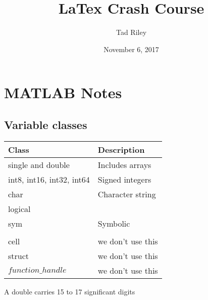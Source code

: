 \documentclass[12pt]{article}
\title{LaTex Crash Course}
\author{Tad Riley}
\date{November 6, 2017}
\begin{document}
\newpage

\section{MATLAB Notes}
\subsection{Variable classes}
\begin{tabular}{|l|l|}
	\hline
	Class & Description\\ \hline
	single and double&Includes arrays\\
	int8, int16, int32, int64&Signed integers\\
	char&Character string\\
	logical&\\
	sym&Symbolic\\
	&\\
	cell&we don't use this\\
	struct&we don't use this\\
	$function\_ handle$&we don't use this\\
	
	\hline
\end{tabular}

A double carries 15 to 17 significant digits
\end{document}
